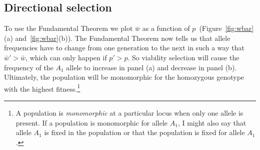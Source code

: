 \documentclass[12pt]{article}
\begin{document}
\subsection*{Directional selection}

To use the Fundamental Theorem we plot $\bar w$ as a function of
$p$~(Figure~\ref{fig:wbar}(a) and~\ref{fig:wbar}(b)). The Fundamental
Theorem now tells us that allele frequencies have to change from one
generation to the next in such a way that $\bar w' > \bar w$, which
can only happen if $p' > p$. So viability selection will cause the
frequency of the $A_1$ allele to increase in panel (a) and decrease in
panel (b). Ultimately, the population will be monomorphic for the
homozygous genotype with the highest fitness.\footnote{A population is
  {\it monomorphic\/} at a particular locus when only one allele is
  present. If a population is monomorphic for allele $A_1$, I might
  also say that allele $A_1$ is fixed in the population or that the
  population is fixed for allele
  $A_1$.}
\end{document}
